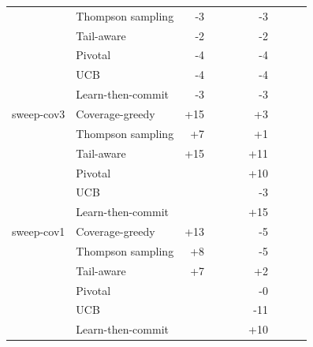 \begin{table}[!t]
\begin{tabular}{@{}llrrrrrrrr@{}}
 & Thompson sampling & -3 &  &  &  & -3 &  &  &  \\
 & Tail-aware & -2 &  &  &  & -2 &  &  &  \\
 & Pivotal & -4 &  &  &  & -4 &  &  &  \\
 & UCB & -4 &  &  &  & -4 &  &  &  \\
 & Learn-then-commit & -3 &  &  &  & -3 &  &  &  \\
\midrule
sweep-cov3 & Coverage-greedy & +15 &  &  &  & +3 &  &  &  \\
 & Thompson sampling & +7 &  &  &  & +1 &  &  &  \\
 & Tail-aware & +15 &  &  &  & +11 &  &  &  \\
 & Pivotal &  &  &  &  & +10 &  &  &  \\
 & UCB &  &  &  &  & -3 &  &  &  \\
 & Learn-then-commit &  &  &  &  & +15 &  &  &  \\
\midrule
sweep-cov1 & Coverage-greedy & +13 &  &  &  & -5 &  &  &  \\
 & Thompson sampling & +8 &  &  &  & -5 &  &  &  \\
 & Tail-aware & +7 &  &  &  & +2 &  &  &  \\
 & Pivotal &  &  &  &  & -0 &  &  &  \\
 & UCB &  &  &  &  & -11 &  &  &  \\
 & Learn-then-commit &  &  &  &  & +10 &  &  &  \\
\bottomrule
\end{tabular}
\end{table}
